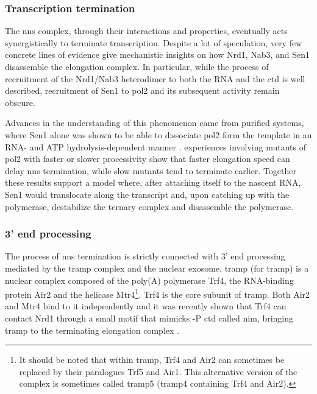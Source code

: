 \subsubsection{Transcription termination}

The \gls{nns} complex, through their interactions and properties, eventually acts synergistically to terminate transcription.
Despite a lot of speculation, very few concrete lines of evidence give mechanistic insights on how Nrd1, Nab3, and Sen1 disassemble the elongation complex.
In particular, while the process of recruitment of the Nrd1/Nab3 heterodimer to both the RNA and the \gls{ctd} is well described, recruitment of Sen1 to \gls{pol2} and its subsequent activity remain obscure.

Advances in the understanding of this phenomenon came from \invitro{} purified systems, where Sen1 alone was shown to be able to dissociate \gls{pol2} form the template in an RNA- and ATP hydrolysis-dependent manner \cite{porrua:2013:bacteriallike}. 
\Invivo{} experiences involving mutants of \gls{pol2} with faster or slower processivity show that faster elongation speed can delay \gls{nns} termination, while slow mutants tend to terminate earlier.
Together these results support a model where, after attaching itself to the nascent RNA, Sen1 would translocate along the transcript and, upon catching up with the polymerase, destabilize the ternary complex and disassemble the polymerase.


\subsubsection{3' end processing} \label{secTramp}

The process of \gls{nns} termination is strictly connected with 3' end processing mediated by the \gls{tramp} complex and the nuclear exosome.
\gls{tramp} (for \glsdesc{tramp}) is a nuclear complex composed of the poly(A) polymerase Trf4, the RNA-binding protein Air2 and the helicase Mtr4\footnote{It should be noted that within \gls{tramp}, Trf4 and Air2 can sometimes be replaced by their paralogues Trf5 and Air1. This alternative version of the complex is sometimes called \gls{tramp}5 (\gls{tramp}4 containing Trf4 and Air2).}.
Trf4 is the core subunit of \gls{tramp}.
Both Air2 and Mtr4 bind to it independently and it was recently shown that Trf4 can contact Nrd1 through a small motif that mimicks \serf{}-P \gls{ctd} called \gls{nim}, bringing \gls{tramp} to the terminating elongation complex \cite{tudek:2014:molecular}.

